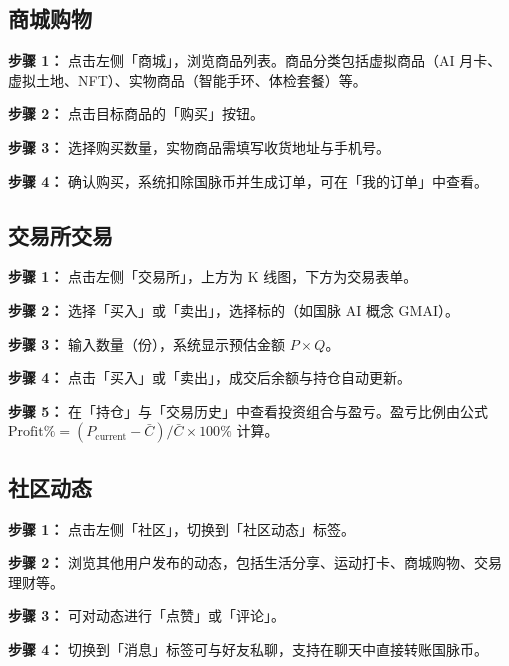 \documentclass[12pt,a4paper]{article}
\begin{document}
\subsection{商城购物}

\textbf{步骤 1：} 点击左侧「商城」，浏览商品列表。商品分类包括虚拟商品（AI 月卡、虚拟土地、NFT）、实物商品（智能手环、体检套餐）等。

\textbf{步骤 2：} 点击目标商品的「购买」按钮。

\textbf{步骤 3：} 选择购买数量，实物商品需填写收货地址与手机号。

\textbf{步骤 4：} 确认购买，系统扣除国脉币并生成订单，可在「我的订单」中查看。

\subsection{交易所交易}

\textbf{步骤 1：} 点击左侧「交易所」，上方为 K 线图，下方为交易表单。

\textbf{步骤 2：} 选择「买入」或「卖出」，选择标的（如国脉 AI 概念 GMAI）。

\textbf{步骤 3：} 输入数量（份），系统显示预估金额 $P \times Q$。

\textbf{步骤 4：} 点击「买入」或「卖出」，成交后余额与持仓自动更新。

\textbf{步骤 5：} 在「持仓」与「交易历史」中查看投资组合与盈亏。盈亏比例由公式 $\mathrm{Profit}\% = (P_{\mathrm{current}} - \bar{C})/\bar{C} \times 100\%$ 计算。

\subsection{社区动态}

\textbf{步骤 1：} 点击左侧「社区」，切换到「社区动态」标签。

\textbf{步骤 2：} 浏览其他用户发布的动态，包括生活分享、运动打卡、商城购物、交易理财等。

\textbf{步骤 3：} 可对动态进行「点赞」或「评论」。

\textbf{步骤 4：} 切换到「消息」标签可与好友私聊，支持在聊天中直接转账国脉币。
\end{document}

